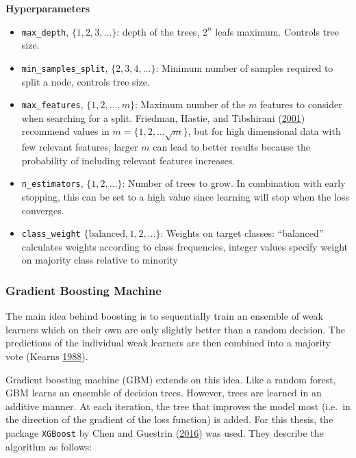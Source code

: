 \documentclass[
  11pt,
  a4paper,
  DIV=12,captions=tableheading,oneside,titlepage]{scrbook}
\providecommand{\tightlist}{%
  \setlength{\itemsep}{0pt}\setlength{\parskip}{0pt}}
\begin{document}
\textbf{Hyperparameters}

\begin{itemize}
\tightlist
\item
  \texttt{max\_depth}, \(\{1,2,3, \ldots\}\): depth of the trees, \(2^n\) leafs maximum. Controls tree size.
\item
  \texttt{min\_samples\_split}, \(\{2,3,4,\ldots\}\): Minimum number of samples required to split a node, controls tree size.
\item
  \texttt{max\_features}, \(\{1, 2, \ldots, m\}\): Maximum number of the \(m\) features to consider when searching for a split. Friedman, Hastie, and Tibshirani (\protect\hyperlink{ref-friedman2001elements}{2001}) recommend values in \(m = \{1, 2, \ldots \sqrt{m}\}\), but for high dimensional data with few relevant features, larger \(m\) can lead to better results because the probability of including relevant features increases.
\item
  \texttt{n\_estimators}, \(\{1, 2, \ldots\}\): Number of trees to grow. In combination with early stopping, this can be set to a high value since learning will stop when the loss converges.
\item
  \texttt{class\_weight} \(\{\text{balanced}, 1,2,\ldots\}\): Weights on target classes: ``balanced'' calculates weights according to class frequencies, integer values specify weight on majority class relative to minority
\end{itemize}

\hypertarget{methods-gbm}{%
\subsubsection{Gradient Boosting Machine}\label{methods-gbm}}

The main idea behind boosting is to sequentially train an ensemble of weak learners which on their own are only slightly better than a random decision. The predictions of the individual weak learners are then combined into a majority vote (Kearns \protect\hyperlink{ref-kearns1988thoughts}{1988}).

Gradient boosting machine (GBM) extends on this idea. Like a random forest, GBM learns an ensemble of decision trees. However, trees are learned in an additive manner. At each iteration, the tree that improves the model most (i.e.~in the direction of the gradient of the loss function) is added. For this thesis, the package \texttt{XGBoost} by Chen and Guestrin (\protect\hyperlink{ref-chen2016xgboost}{2016}) was used. They describe the algorithm as follows:
\end{document}

